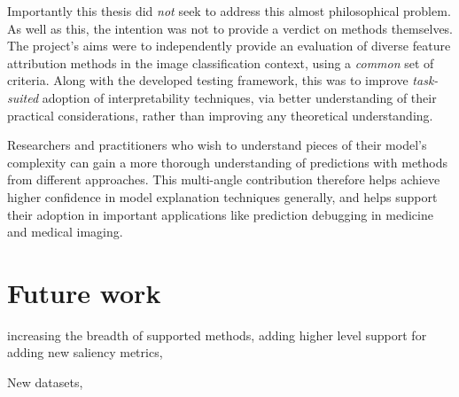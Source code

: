 \documentclass[main]{subfiles}
\begin{document}
Importantly this thesis did \textit{not} seek to address this almost philosophical problem. As well as this, the intention was not to provide a verdict on methods themselves. The project's aims were to independently provide an evaluation of diverse feature attribution methods in the image classification context, using a \textit{common} set of criteria. Along with the developed testing framework, this was to improve \textit{task-suited} adoption of interpretability techniques, via better understanding of their practical considerations, rather than improving any theoretical understanding.

Researchers and practitioners who wish to understand pieces of their model's complexity can gain a more thorough understanding of predictions with methods from different approaches. This multi-angle contribution therefore helps achieve higher confidence in model explanation techniques generally, and helps support their adoption in important applications like prediction debugging in medicine and medical imaging.

\section{Future work}

increasing the breadth of supported methods, adding higher level support for adding new saliency metrics, 

New datasets, 
\end{document}
